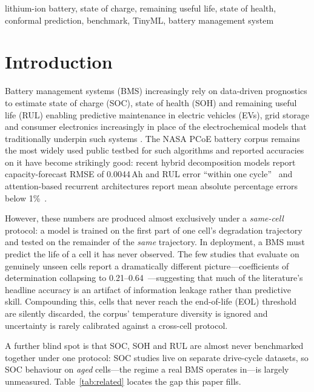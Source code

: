 \documentclass[conference,a4paper]{IEEEtran}
\begin{document}
\begin{IEEEkeywords}
lithium-ion battery, state of charge, remaining useful life, state of health,
conformal prediction, benchmark, TinyML, battery management system
\end{IEEEkeywords}

\section{Introduction}
Battery management systems (BMS) increasingly rely on data-driven prognostics
to estimate state of charge (SOC), state of health (SOH) and remaining useful
life (RUL) enabling predictive maintenance in electric vehicles (EVs), grid
storage and consumer electronics \cite{vidal2020} increasingly in place of
the electrochemical models that traditionally underpin such
systems \cite{doyle1993,santhanagopalan2006}.
The NASA PCoE battery corpus \cite{saha2007} remains the most
widely used public testbed for such algorithms and reported accuracies on it
have become strikingly good: recent hybrid decomposition models report
capacity-forecast RMSE of 0.0044\,Ah and RUL error ``within one
cycle''~\cite{ceemdan2025} and attention-based recurrent architectures report
mean absolute percentage errors below 1\%~\cite{tlstm2025}.

However, these numbers are produced almost exclusively under a
\emph{same-cell} protocol: a model is trained on the first part of one cell's
degradation trajectory and tested on the remainder of the \emph{same}
trajectory. In deployment, a BMS must predict the life of a cell it has never
observed. The few studies that evaluate on genuinely unseen cells report a
dramatically different picture---coefficients of determination collapsing to
0.21--0.64~\cite{cnnframework2026}---suggesting that much of the literature's
headline accuracy is an artifact of information leakage rather than predictive
skill. Compounding this, cells that never reach the end-of-life (EOL)
threshold are silently discarded, the corpus' temperature diversity is
ignored and uncertainty is rarely calibrated against a cross-cell protocol.

A further blind spot is that SOC, SOH and RUL are almost never benchmarked
together under one protocol: SOC studies live on separate drive-cycle
datasets, so SOC behaviour on \emph{aged} cells---the regime a real BMS
operates in---is largely unmeasured. Table~\ref{tab:related} locates the gap
this paper fills.
\end{document}

